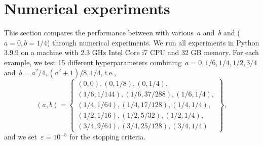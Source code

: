 \documentclass[../main]{subfiles}
\begin{document}
\section{Numerical experiments} 
This section compares the performance between  with various~$a$ and~$b$ and  ($a = 0, b = 1 / 4$) through numerical experiments.
We run all experiments in Python 3.9.9 on a machine with 2.3 GHz Intel Core i7 CPU and 32 GB memory.
For each example, we test 15 different hyperparameters combining~$a = 0, 1 / 6, 1 / 4, 1 / 2, 3 / 4$ and~$b = a^2 / 4, (a^2 + 1) / 8, 1 / 4$, i.e.,
\begin{equation}
    (a, b) = \left\{
        \begin{gathered}
            (0, 0), (0, 1 / 8), (0, 1 / 4),\\
            (1 / 6, 1 / 144), (1 / 6, 37 / 288), (1 / 6, 1 / 4),\\
            (1 / 4, 1 / 64), (1 / 4, 17 / 128), (1 / 4, 1 / 4), \\
            (1 / 2, 1 / 16), (1 / 2, 5 / 32), (1 / 2, 1 / 4), \\
            (3 / 4, 9 / 64), (3 / 4, 25 / 128), (3 / 4, 1 / 4)
        \end{gathered}
    \right\},
\end{equation} 
and we set~$\varepsilon = 10^{-5}$ for the stopping criteria.
\end{document}
